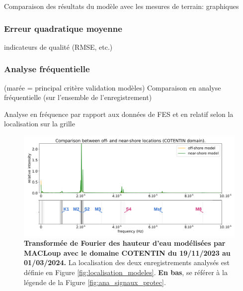 \documentclass[10pt,a4paper,titlepage]{article}
\begin{document}
Comparaison des résultats du modèle avec les mesures de terrain: graphiques

\subsubsection{Erreur quadratique moyenne}
indicateurs de qualité (RMSE, etc.)

\subsubsection{Analyse fréquentielle}
(marée = principal critère validation modèles)
Comparaison en analyse fréquentielle (sur l'ensemble de l'enregistrement)

Analyse en fréquence par rapport aux données de FES et en relatif selon la localisation sur la grille

\begin{figure}[h!]
    \centering
    \includegraphics[scale=0.4]{../images/post_traitement/COTENTIN_analyse_off-near-shore.pdf}
    \caption{
        \textbf{Transformée de Fourier des hauteur d'eau modélisées par MACLoup avec le domaine COTENTIN du 19/11/2023 au 01/03/2024.}
        La localisation des deux enregistrements analysés est définie en Figure \ref{fig:localisation_modeles}.
        \textbf{En bas}, se référer à la légende de la Figure \ref{fig:ana_signaux_protec}.
    }
    \label{fig:analyse_COTENTIN}
\end{figure}
\end{document}
